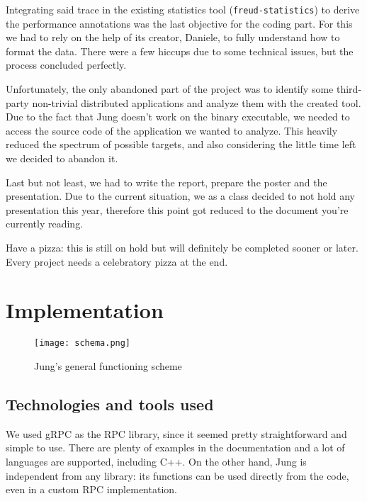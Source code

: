         Integrating said trace in the existing statistics tool (\texttt{freud-statistics}) to derive
        the performance annotations was the last objective for the coding part. For this we had to rely on the
        help of its creator, Daniele, to fully understand how to format the data. There were a few hiccups due to
        some technical issues, but the process concluded perfectly.

        Unfortunately, the only abandoned part of the project was to identify some third-party non-trivial
        distributed applications and analyze them with the created tool. Due to the fact that Jung doesn't work 
        on the binary executable, we needed to access the source code of the application we wanted to 
        analyze. This heavily reduced the spectrum of possible targets, and also considering the little time left we
        decided to abandon it.

        Last but not least, we had to write the report, prepare the poster and the presentation. Due to the current
        situation, we as a class decided to not hold any presentation this year, therefore this point got reduced
        to the document you're currently reading.
        
        Have a pizza: this is still on hold but will definitely be completed sooner or later. Every project needs
        a celebratory pizza at the end.
        

\chapter{Implementation}

    \begin{figure}[H]
        \centering
        \texttt{[image: schema.png]}
        \caption{Jung's general functioning scheme}
        \label{fig:schema}
    \end{figure}
    

    \section{Technologies and tools used}

        We used gRPC \cite{gRPCdocs} as the RPC library, since it seemed pretty straightforward and simple
        to use. There are plenty of examples in the documentation and a lot of languages are supported,
        including C++. On the other hand, Jung is independent from any library:
        its functions can be used directly from the code, even in a custom RPC implementation.

